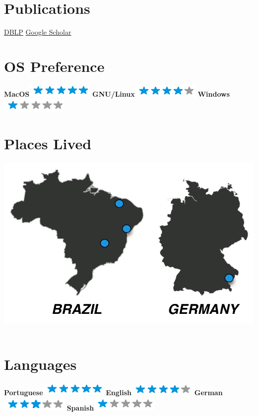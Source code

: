 \documentclass[nocolors]{friggeri-cv-a4}
\begin{document}
\begin{aside}
	 ~
	\section{Publications}
	\href{https://dblp.org/pid/88/10587.html}{DBLP}
	\href{https://scholar.google.com.br/citations?user=\_CgZOX0AAAAJ}{Google Scholar}
	~
	\section{OS Preference}
	\textbf{MacOS}\includegraphics[scale=0.40]{img/5stars.png}
	\textbf{GNU/Linux}\includegraphics[scale=0.40]{img/4stars.png}
	\textbf{Windows}\includegraphics[scale=0.40]{img/1stars.png}
	~
	\section{Places Lived}
	\includegraphics[scale=0.25]{img/places.pdf}
	~
	\section{Languages}
	\textbf{Portuguese}\includegraphics[scale=0.40]{img/5stars.png}
	\textbf{English}\includegraphics[scale=0.40]{img/4stars.png}
	\textbf{German}\includegraphics[scale=0.40]{img/3stars.png}
	\textbf{Spanish}\includegraphics[scale=0.40]{img/1stars.png}
	~
\end{aside}
\end{document}
